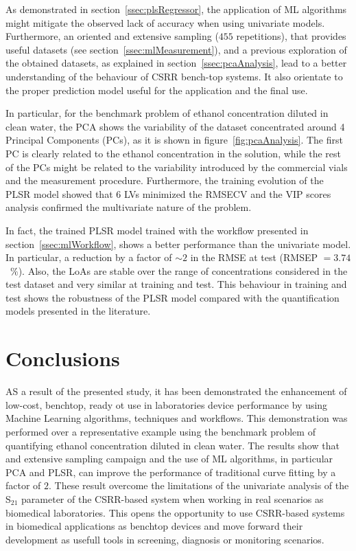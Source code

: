 \documentclass[journal,twoside,web]{ieeecolor}
\begin{document}
As demonstrated in section~\ref{ssec:plsRegressor}, the application of ML algorithms might mitigate the observed lack of accuracy when using univariate models.  Furthermore, an oriented and extensive sampling ($455$ repetitions), that provides useful datasets (see section~\ref{ssec:mlMeasurement}), and a previous exploration of the obtained datasets, as explained in section~\ref{ssec:pcaAnalysis}, lead to a better understanding of the behaviour of CSRR bench-top systems. It also orientate to the proper prediction model useful for the application and the final use.

In particular, for the benchmark problem of ethanol concentration diluted in clean water, the PCA shows the variability of the dataset concentrated around 4 Principal Components (PCs), as it is shown in figure~\ref{fig:pcaAnalysis}. The first PC is clearly related to the ethanol concentration in the solution, while the rest of the PCs might be related to the variability introduced by the commercial vials and the measurement procedure. Furthermore, the training evolution of the PLSR model showed that 6 LVs minimized the RMSECV and the VIP scores analysis confirmed the multivariate nature of the problem.
 
In fact, the trained PLSR model trained with the workflow presented in section~\ref{ssec:mlWorkflow}, shows a better performance than the univariate model. In particular, a reduction by a factor of $\sim2$ in the RMSE at test (RMSEP $=3.74$~$\%$). Also, the LoAs are stable over the range of concentrations considered in the test dataset and very similar at training and test. This behaviour in training and test shows the robustness of the PLSR model compared with the quantification models presented in the literature. 

\section{Conclusions}
\label{sec:conclusion}
AS a result of the presented study, it has been demonstrated the enhancement of low-cost, benchtop, ready ot use in laboratories device performance by using Machine Learning algorithms, techniques and workflows. This demonstration was performed over a representative example using the benchmark problem of quantifying ethanol concentration diluted in clean water. The results show that and extensive sampling campaign and the use of ML algorithms, in particular PCA and PLSR, can improve the performance of traditional curve fitting by a factor of $2$.
These result overcome the limitations of the univariate analysis of the S$_{21}$ parameter of the CSRR-based system when working in real scenarios as biomedical laboratories. This opens the opportunity to use CSRR-based systems in biomedical applications as benchtop devices and move forward their development as usefull tools in screening, diagnosis or monitoring scenarios.
\end{document}
